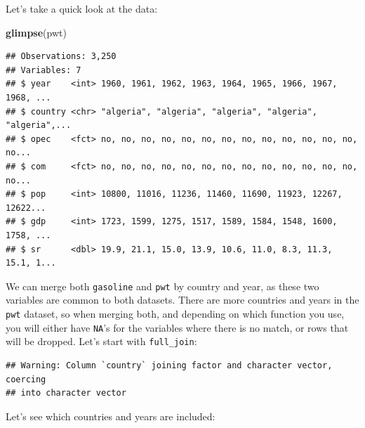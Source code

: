 \documentclass[]{gitbook}
\newenvironment{Shaded}{\begin{snugshade}}{\end{snugshade}}
\newcommand{\DataTypeTok}[1]{\textcolor[rgb]{0.13,0.29,0.53}{#1}}
\newcommand{\KeywordTok}[1]{\textcolor[rgb]{0.13,0.29,0.53}{\textbf{#1}}}
\newcommand{\NormalTok}[1]{#1}
\newcommand{\OperatorTok}[1]{\textcolor[rgb]{0.81,0.36,0.00}{\textbf{#1}}}
\newcommand{\StringTok}[1]{\textcolor[rgb]{0.31,0.60,0.02}{#1}}
\begin{document}
Let's take a quick look at the data:

\begin{Shaded}
\begin{Highlighting}[]
\KeywordTok{glimpse}\NormalTok{(pwt)}
\end{Highlighting}
\end{Shaded}

\begin{verbatim}
## Observations: 3,250
## Variables: 7
## $ year    <int> 1960, 1961, 1962, 1963, 1964, 1965, 1966, 1967, 1968, ...
## $ country <chr> "algeria", "algeria", "algeria", "algeria", "algeria",...
## $ opec    <fct> no, no, no, no, no, no, no, no, no, no, no, no, no, no...
## $ com     <fct> no, no, no, no, no, no, no, no, no, no, no, no, no, no...
## $ pop     <int> 10800, 11016, 11236, 11460, 11690, 11923, 12267, 12622...
## $ gdp     <int> 1723, 1599, 1275, 1517, 1589, 1584, 1548, 1600, 1758, ...
## $ sr      <dbl> 19.9, 21.1, 15.0, 13.9, 10.6, 11.0, 8.3, 11.3, 15.1, 1...
\end{verbatim}

We can merge both \texttt{gasoline} and \texttt{pwt} by country and year, as these two variables are common to
both datasets. There are more countries and years in the \texttt{pwt} dataset, so when merging both, and
depending on which function you use, you will either have \texttt{NA}'s for the variables where there is
no match, or rows that will be dropped. Let's start with \texttt{full\_join}:

\begin{Shaded}
\end{Shaded}

\begin{verbatim}
## Warning: Column `country` joining factor and character vector, coercing
## into character vector
\end{verbatim}

Let's see which countries and years are included:

\begin{Shaded}
\end{Shaded}
\end{document}
